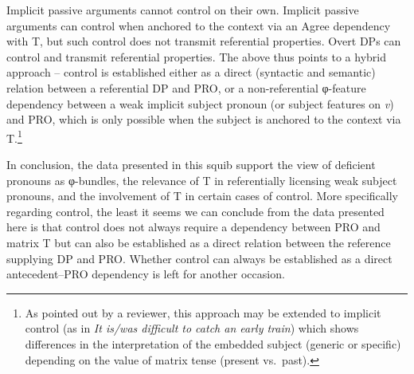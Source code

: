 \documentclass[output=paper]{langsci/langscibook}
\begin{document}
\ea
	\ea Implicit passive arguments cannot control on their own.
	\ex Implicit passive arguments can control when anchored to the context via an Agree dependency with T, but such control does not transmit referential properties.
	\ex Overt DPs can control and transmit referential properties.
	\z
\z
%
The above thus points to a hybrid approach -- control is established either as a
direct (syntactic and semantic)  relation between a referential DP and
PRO, or a non-referential φ-feature dependency between a weak implicit subject
pronoun (or subject features on \emph{v}) and PRO, which is only possible when
the subject is anchored to the context via T.\footnote{As pointed out by a
    reviewer, this approach may be extended to implicit control (as in \emph{It
    is/was difficult to catch an early train}) which shows differences in the
interpretation of the embedded subject (generic or specific) depending on the
value of matrix tense (present vs.\ past).}

In conclusion, the data presented in this squib support the view of deficient
pronouns as φ-bundles, the relevance of T in referentially licensing weak
subject pronouns, and the involvement of T in certain cases of control. More
specifically regarding control, the least it seems we can conclude from the
data presented here is that control does not always require a dependency
between PRO and matrix T but can also be established as a direct relation
between the reference supplying DP and PRO. Whether control can always be
established as a direct antecedent--PRO dependency is left for another occasion.
\pagebreak
\printchapterglossary{}

{\sloppy\printbibliography[heading=subbibliography,notkeyword=this]}
\end{document}
